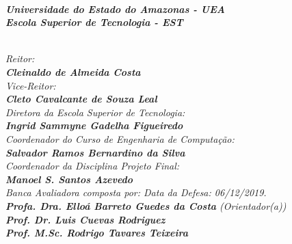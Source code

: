 \begin{spacing}{1.4}
\textit{\textbf{\\
Universidade do Estado do Amazonas - UEA\\
Escola Superior de Tecnologia - EST}}

\textit{\\
Reitor:\\
\textbf{
Cleinaldo de Almeida Costa}\\
Vice-Reitor:\\ \textbf{Cleto Cavalcante de Souza Leal}}
\\
\textit{
Diretora da Escola Superior de Tecnologia:\\
\textbf{Ingrid Sammyne Gadelha Figueiredo}}
\\
\textit{
Coordenador do Curso de Engenharia de Computa\c{c}\~{a}o:\\
\textbf{Salvador Ramos Bernardino da Silva}}
\\
\textit{
Coordenador da Disciplina Projeto Final:\\
\textbf{Manoel S. Santos Azevedo}}
\\[12pt]
\textit{
Banca Avaliadora composta por: \hfill Data da Defesa: 06/12/2019.\\
}
\textit{
\textbf{Profa. Dra. Elloá Barreto Guedes da Costa} (Orientador(a))\\
\textbf{Prof. Dr. Luis Cuevas Rodriguez}\\%
\textbf{Prof. M.Sc. Rodrigo Tavares Teixeira}
}
\ \ \\
 \begin{small}
\begin{center}
\end{center}
\end{small}
\end{spacing}
 \newpage
